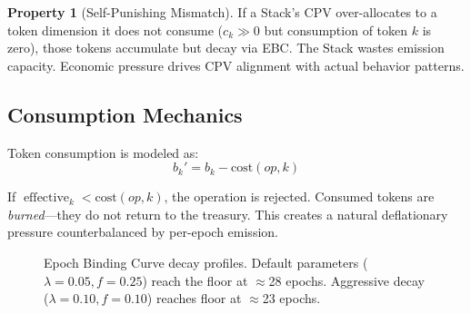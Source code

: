 \documentclass[11pt,twocolumn]{article}
\theoremstyle{definition}
\newtheorem{property}{Property}[section]
\theoremstyle{plain}
\theoremstyle{remark}
\DeclareMathOperator{\effectivebal}{effective}
\begin{document}
\begin{property}[Self-Punishing Mismatch]\label{prop:mismatch}
If a Stack's CPV over-allocates to a token dimension it does not consume ($c_k \gg 0$ but consumption of token $k$ is zero), those tokens accumulate but decay via EBC. The Stack wastes emission capacity. Economic pressure drives CPV alignment with actual behavior patterns.
\end{property}

\subsection{Consumption Mechanics}

Token consumption is modeled as:
\begin{equation}
  b_k' = b_k - \mathrm{cost}(op, k)
\end{equation}

If $\effectivebal_k < \mathrm{cost}(op, k)$, the operation is rejected. Consumed tokens are \emph{burned}---they do not return to the treasury. This creates a natural deflationary pressure counterbalanced by per-epoch emission.

\begin{figure}[t]
\centering
{}
\caption{Epoch Binding Curve decay profiles. Default parameters ($\lambda=0.05, f=0.25$) reach the floor at $\approx$28 epochs. Aggressive decay ($\lambda=0.10, f=0.10$) reaches floor at $\approx$23 epochs.}
\label{fig:ebc}
\end{figure}

\end{document}

